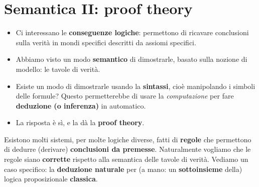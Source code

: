 
\section{Semantica II: proof theory}

\begin{itemize}
  \item Ci interessano le \textbf{conseguenze logiche}: permettono di ricavare
        conclusioni sulla verità in mondi specifici descritti da assiomi
        specifici.
  \item Abbiamo visto un modo \textbf{semantico} di dimostrarle, basato sulla
        nozione di modello: le tavole di verità.
  \item Esiste un modo di dimostrarle usando la \textbf{sintassi}, cioè
        manipolando i simboli delle formule? Questo permetterebbe di usare la
        \emph{computazione} per fare \textbf{deduzione (o inferenza)} in
        automatico.
  \item La risposta è sì, e la dà la \textbf{proof theory}.
\end{itemize}

Esistono molti sistemi, per molte logiche diverse, fatti di \textbf{regole}
che permettono di dedurre (derivare) \textbf{conclusioni da premesse}.
Naturalmente vogliamo che le regole siano \textbf{corrette} rispetto alla
semantica delle tavole di verità. Vediamo un caso specifico: la
\textbf{deduzione naturale} per (a mano: un \textbf{sottoinsieme} della)
logica proposizionale \textbf{classica}.


